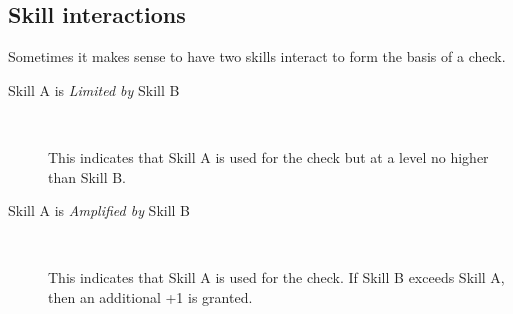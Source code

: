 \subsection{Skill interactions}\label{sec:skill-interactions} %

Sometimes it makes sense to have two skills interact to form the basis of a
check.
\begin{description}
\item[Skill A is \emph{Limited by} Skill B]~

This indicates that Skill A is used for the check but at a level no
higher than Skill B.
\item[Skill A is \emph{Amplified by} Skill B]~

This indicates that Skill A is used for the check. If Skill B exceeds Skill
A, then an additional +1 is granted.
\end{description}

